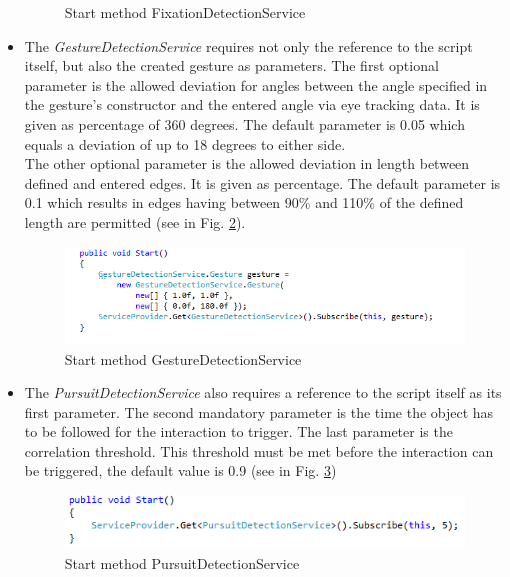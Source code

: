 \documentclass[../../Instructions_Framework]{subfiles}
\begin{document}
\begin{itemize}
\begin{figure}[h!]
		\caption{Start method FixationDetectionService}
		\label{fig:startfix}
	\end{figure}
	\item The \textit{GestureDetectionService} requires not only the reference to the script itself, but also the created gesture as parameters. The first optional parameter is the allowed deviation for angles between the angle specified in the gesture's constructor and the entered angle via eye tracking data. It is given as percentage of 360 degrees. The default parameter is 0.05 which equals a deviation of up to 18 degrees to either side.\\
	The other optional parameter is the allowed deviation in length between defined and entered edges. It is given as percentage. The default parameter is 0.1 which results in edges having between 90\% and 110\% of the defined length are permitted (see in Fig. \ref{startGesture}).
	\begin{figure}[h!]
		\centering
		\includegraphics[width=0.7\linewidth]{img/StartGest}
		\caption{Start method GestureDetectionService}
		\label{startGesture}
	\end{figure}
	\item The \textit{PursuitDetectionService} also requires a reference to the script itself as its first parameter. The second mandatory parameter is the time the object has to be followed for the interaction to trigger. The last parameter is the correlation threshold. This threshold must be met before the interaction can be triggered, the default value is 0.9 (see in Fig. \ref{fig:startpur})
	\begin{figure}[h!]
		\centering
		\includegraphics[width=0.7\linewidth]{img/StartPur}
		\caption{Start method PursuitDetectionService}
		\label{fig:startpur}
	\end{figure}
	\end{itemize}
\end{document}
